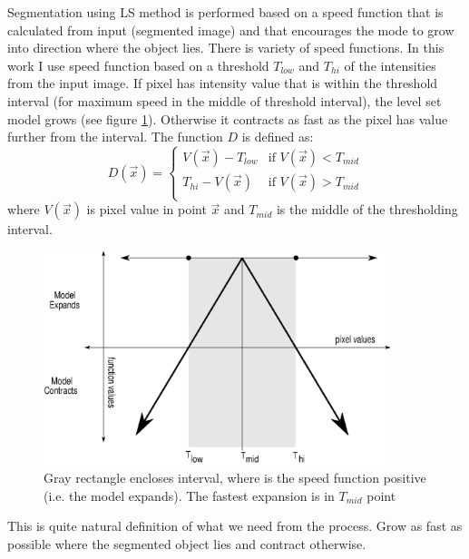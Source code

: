 Segmentation using LS method is performed based on a speed function that is calculated from input (segmented image) and that encourages the mode to grow into direction where the object lies.
There is variety of speed functions. In this work I use speed function based on a threshold $T_{low}$ and $T_{hi}$ of the intensities from the input image.
If pixel has intensity value that is within the threshold interval (for maximum speed in the middle of threshold interval), the level set model grows (see figure \ref{fg:speedFunction}).
Otherwise it contracts as fast as the pixel has value further from the interval. The function $D$ is defined as:
\begin{equation}
\label{eq:speedFunction}
D(\vec{x}) =
\begin{cases}
V(\vec{x}) - T_{low} & \text{if $V(\vec{x}) < T_{mid}$}\\
T_{hi} - V(\vec{x}) & \text{if $V(\vec{x}) > T_{mid}$}\\
\end{cases}
\end{equation}
where $V(\vec{x})$ is pixel value in point $\vec{x}$ and $T_{mid}$ is the middle of the thresholding interval.

\begin{figure}
    \centering
    \includegraphics[width=0.9\textwidth]{data/speedFunction}
    \caption[Graph of thresholding based speed function]
    {
      Gray rectangle encloses interval, where is the speed function positive (i.e. the model expands).
      The fastest expansion is in $T_{mid}$ point
    }
    \label{fg:speedFunction}
\end{figure}

This is quite natural definition of what we need from the process.
Grow as fast as possible where the segmented object lies and contract otherwise.

